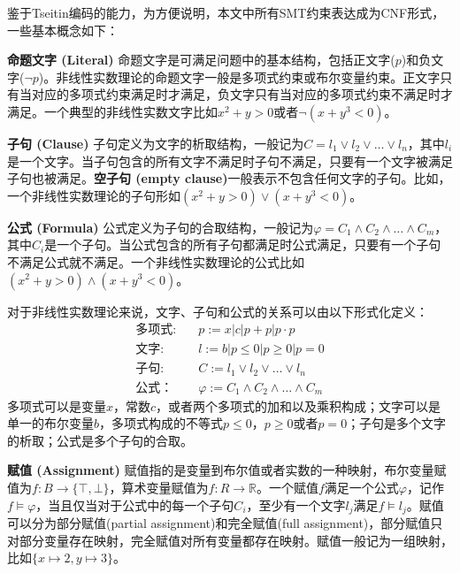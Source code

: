 鉴于Tseitin编码的能力，为方便说明，本文中所有SMT约束表达成为CNF形式，一些基本概念如下：
\begin{definition}{\textbf{命题文字 (Literal)}}
命题文字是可满足问题中的基本结构，包括正文字($p$)和负文字($\neg p$)。非线性实数理论的命题文字一般是多项式约束或布尔变量约束。正文字只有当对应的多项式约束满足时才满足，负文字只有当对应的多项式约束不满足时才满足。一个典型的非线性实数文字比如$x^2 + y > 0$或者$\neg (x + y^3 < 0)$。
\end{definition}

\begin{definition}{\textbf{子句 (Clause)}}
子句定义为文字的析取结构，一般记为$C = l_1 \vee l_2 \vee \dots \vee l_n$，其中$l_i$是一个文字。当子句包含的所有文字不满足时子句不满足，只要有一个文字被满足子句也被满足。\textbf{空子句 (empty clause)}一般表示不包含任何文字的子句。比如，一个非线性实数理论的子句形如$(x^2 + y > 0) \vee (x + y^3 < 0)$。
\end{definition}

\begin{definition}{\textbf{公式 (Formula)}}
公式定义为子句的合取结构，一般记为$\varphi = C_1 \wedge C_2 \wedge \dots \wedge C_m$，其中$C_i$是一个子句。当公式包含的所有子句都满足时公式满足，只要有一个子句不满足公式就不满足。一个非线性实数理论的公式比如$(x^2 + y > 0) \wedge (x + y^3 < 0)$。
\end{definition}

对于非线性实数理论来说，文字、子句和公式的关系可以由以下形式化定义：
\begin{align*}
\textbf{多项式:} \quad & p := x | c | p + p | p \cdot p \\
\textbf{文字:} \quad & l := b | p \leq 0 | p \geq 0 | p = 0 \\
\textbf{子句:} \quad & C := l_1 \vee l_2 \vee \dots \vee l_n \\
\textbf{公式：} \quad & \varphi := C_1 \wedge C_2 \wedge \dots \wedge C_m
\end{align*}
多项式可以是变量$x$，常数$c$，或者两个多项式的加和以及乘积构成；文字可以是单一的布尔变量$b$，多项式构成的不等式$p \leq 0$，$p \geq 0$或者$p = 0$；子句是多个文字的析取；公式是多个子句的合取。

\begin{definition}{\textbf{赋值 (Assignment)}}
赋值指的是变量到布尔值或者实数的一种映射，布尔变量赋值为$f: B \rightarrow \{\top, \bot\}$，算术变量赋值为$f: R \rightarrow \mathbb{R}$。一个赋值$f$满足一个公式$\varphi$，记作$f \models \varphi$，当且仅当对于公式中的每一个子句$C_i$，至少有一个文字$l_j$满足$f \models l_j$。赋值可以分为部分赋值(partial assignment)和完全赋值(full assignment)，部分赋值只对部分变量存在映射，完全赋值对所有变量都存在映射。赋值一般记为一组映射，比如$\{x \mapsto 2, y \mapsto 3\}$。
\end{definition}

